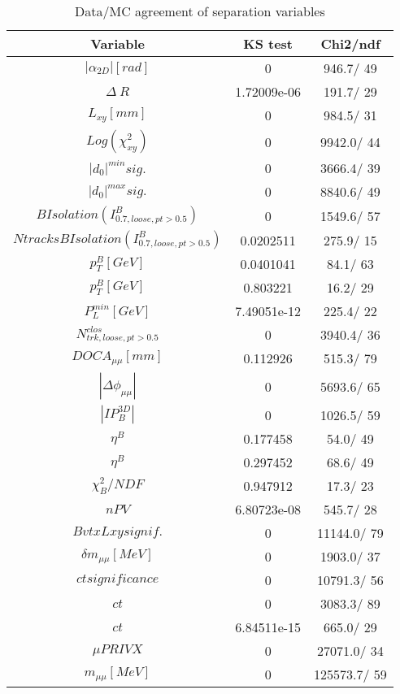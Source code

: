 \documentclass{article}
\begin{document}
\begin{table}[htbp]
\caption{\label{tab:sepVars}Data/MC agreement of separation variables}
\begin{center}
\begin{tabular}{c|c|c}
Variable & KS test & Chi2/ndf \\
\hline
$|\alpha_{2D}| [rad]$ & 0 & 946.7/ 49\\
\hline
$\Delta~R$ & 1.72009e-06 & 191.7/ 29\\
\hline
$L_{xy} [mm]$ & 0 & 984.5/ 31\\
\hline
$Log(\chi^{2}_{xy})$ & 0 & 9942.0/ 44\\
\hline
$|d_{0}|^{min} sig.$ & 0 & 3666.4/ 39\\
\hline
$|d_{0}|^{max} sig.$ & 0 & 8840.6/ 49\\
\hline
$B Isolation (I^{B}_{0.7, loose, pt>0.5})$ & 0 & 1549.6/ 57\\
\hline
$Ntracks B Isolation (I^{B}_{0.7, loose, pt>0.5})$ & 0.0202511 & 275.9/ 15\\
\hline
$p_{T}^{B} [GeV]$ & 0.0401041 &  84.1/ 63\\
\hline
$p_{T}^{B} [GeV]$ & 0.803221 &  16.2/ 29\\
\hline
$P^{min}_{L} [GeV]$ & 7.49051e-12 & 225.4/ 22\\
\hline
$N^{clos}_{trk, loose, pt>0.5}$ & 0 & 3940.4/ 36\\
\hline
$DOCA_{\mu\mu} [mm]$ & 0.112926 & 515.3/ 79\\
\hline
$|\Delta\phi_{\mu\mu}|$ & 0 & 5693.6/ 65\\
\hline
$|IP_{B}^{3D}|$ & 0 & 1026.5/ 59\\
\hline
$\eta^{B}$ & 0.177458 &  54.0/ 49\\
\hline
$\eta^{B}$ & 0.297452 &  68.6/ 49\\
\hline
$\chi^{2}_{B}/NDF$ & 0.947912 &  17.3/ 23\\
\hline
$nPV$ & 6.80723e-08 & 545.7/ 28\\
\hline
$BvtxLxy signif.$ & 0 & 11144.0/ 79\\
\hline
$\delta m_{\mu\mu} [MeV]$ & 0 & 1903.0/ 37\\
\hline
$ct significance$ & 0 & 10791.3/ 56\\
\hline
$ct$ & 0 & 3083.3/ 89\\
\hline
$ct$ & 6.84511e-15 & 665.0/ 29\\
\hline
$\mu PRIVX$ & 0 & 27071.0/ 34\\
\hline
$m_{\mu\mu} [MeV]$ & 0 & 125573.7/ 59\\

\end{tabular}
\end{center}
\end{table}
\end{document}
